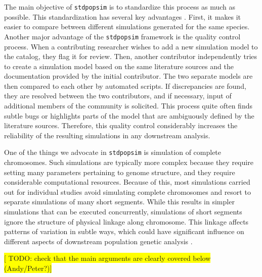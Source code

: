 \documentclass{article}
\newcommand{\stdpopsim}{\texttt{stdpopsim}\xspace}
\begin{document}
The main objective of \texttt{\stdpopsim} is to standardize this process as much as possible.
This standardization has several key advantages \citep{Adrion2020}. First, it makes it easier to compare between different
simulations generated for the same species. Another major advantage of the
\texttt{\stdpopsim} framework is the quality control process.
When a contributing researcher wishes to add a new simulation model to the catalog,
they flag it for review. Then, another contributor independently tries to create a simulation model based on the same literature sources and the documentation provided by the initial contributor. The two separate models are then
compared to each other by automated scripts. If discrepancies are found, they
are resolved between the two contributors, and if necessary, input of additional members of the community is solicited. This process quite often
finds subtle bugs  \citep{Ragsdale2020} or highlights parts of the model that are
ambiguously defined by the literature sources. 
Therefore, this quality control considerably increases the reliability of the
resulting simulations in any downstream analysis.



One of the things we advocate in \texttt{\stdpopsim} is simulation of complete
chromosomes. Such simulations are typically more complex because they require
setting many parameters pertaining to genome structure, and they require
considerable computational resources. Because of this, most simulations carried
out for individual studies avoid simulating complete chromosomes and resort to
separate simulations of many short segments. While this results in simpler
simulations that can be executed concurrently, %
simulations of short segments ignore the structure of physical linkage along
chromosome. This linkage affects patterns of variation in subtle ways, which could
have significant influence on different aspects of downstream population genetic
analysis \citep{Nelson2020}. 


\noindent\colorbox{yellow}{[ TODO: check that the main arguments are clearly covered below (Andy/Peter?)]}
\end{document}
